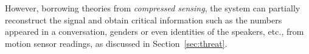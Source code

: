 However, borrowing theories from \textit{compressed sensing}, the {\systemName} system can partially reconstruct the signal and obtain critical information such as the numbers appeared in a conversation, genders or even identities of the speakers, etc., from motion sensor readings, as discussed in Section~\ref{sec:threat}.



%


%
%
%


%




